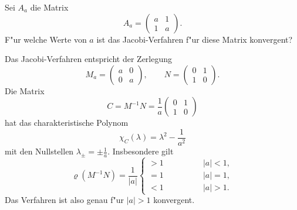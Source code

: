 Sei $A_a$ die Matrix
\[
A_a=\begin{pmatrix}a&1\\1&a\end{pmatrix}.
\]
F"ur welche Werte von $a$ ist das Jacobi-Verfahren f"ur diese Matrix
konvergent?

\begin{loesung}
Das Jacobi-Verfahren entspricht der Zerlegung
\[
M_a=\begin{pmatrix}a&0\\0&a\end{pmatrix},\qquad
N=\begin{pmatrix}0&1\\1&0\end{pmatrix}.
\]
Die Matrix
\[
C=M^{-1}N=\frac1a\begin{pmatrix}0&1\\1&0\end{pmatrix}
\]
hat das charakteristische Polynom
\[
\chi_C(\lambda)=\lambda^2-\frac1{a^2}
\]
mit den Nullstellen $\lambda_\pm=\pm\frac1a$. Insbesondere gilt
\[
\varrho(M^{-1}N)=\frac1{|a|}\begin{cases}
>1\qquad\qquad &|a| < 1,\\
=1\qquad &|a|=1,\\
<1\qquad &|a| > 1.
\end{cases}
\]
Das Verfahren ist also genau f"ur $|a|>1$ konvergent.
\end{loesung}

